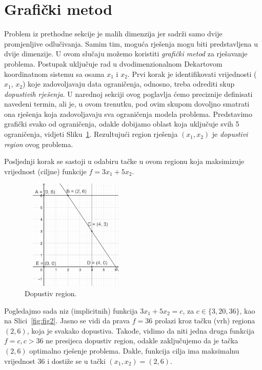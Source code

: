 \documentclass[a4paper, utf8, 11pt, colorlinks]{book}
\theoremstyle{definition}
\begin{document}
\section{Grafički metod}
 Problem iz prethodne sekcije je malih dimenzija jer sadrži samo dvije promjenljive odlučivanja. Samim tim,  moguća rješenja mogu biti predstavljena u dvije dimenzije. U ovom slučaju možemo koristiti \emph{grafički metod} za rješavanje problema. Postupak uključuje rad u dvodimenzionalnom Dekartovom koordinatnom sistemu sa osama $x_1$ i $x_2$.  Prvi korak je identifikovati vrijednosti ($x_1$, $x_2$) koje zadovoljavaju data ograničenja, odnosno, treba odrediti skup \emph{dopustivih rješenja}.    U narednoj sekciji ovog poglavlja ćemo preciznije definisati navedeni termin, ali je, u ovom trenutku, pod ovim skupom dovoljno smatrati ona rješenja koja zadovoljavaju sva ograničenja modela  problema. Predstavimo grafički svako od ograničenja, odakle dobijamo oblast koja uključuje svih 5 ograničenja, vidjeti Sliku~\ref{fig:fig1}.  Rezultujući region rješenja $(x_1, x_2)$ je \emph{dopustivi region} ovog problema.
 
 Posljednji korak se sastoji u odabiru tačke u ovom regionu  koja maksimizuje vrijednost (ciljne) funkcije $f = 3x_1 + 5x_2$. 

\begin{figure}
    \centering
    \includegraphics[width=150pt,height=150pt]{fig1.eps}
    \caption{Dopustiv region.}
    \label{fig:fig1}
\end{figure}
Pogledajmo sada niz (implicitnih) funkcija $3x_1 + 5 x_2 = c$, za $c \in \{3,20, 36\}$, kao na Slici~\ref{fig:fig2}. Jasno se vidi da prava $f = 36$ prolazi kroz tačku (vrh) regiona $(2,6)$, koja je svakako dopustiva. Takođe, vidimo da niti jedna druga funkcija $f=c, c > 36$ ne presijeca dopustiv region, odakle zaključujemo da je tačka $(2, 6)$ optimalno rješenje problema. Dakle, funkcija cilja ima maksimalnu vrijednost 36 i dostiže se u tački $(x_1, x_2)=(2,6)$.
\end{document}

